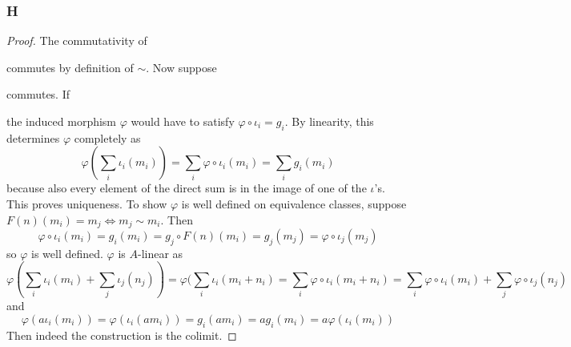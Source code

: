 \documentclass{article}
\newcommand{\fI}{\mathscr{I}}
\begin{document}
\subsubsection{H}\label{1.4.H}
\begin{proof}
    The commutativity of 
    \begin{center}
    \end{center}
    commutes by definition of $\sim$. Now suppose
    \begin{center}
    \end{center}
    commutes. If 
    \begin{center}
    \end{center}
    the induced morphism $\varphi$ would have to satisfy $\varphi\circ \iota_i=g_i$. By linearity, this determines $\varphi$ completely as
    \[
    \varphi(\sum_i \iota_i(m_i))=\sum_i \varphi\circ \iota_i(m_i)=\sum_i g_i(m_i)
    \]
    because also every element of the direct sum is in the image of one of the $\iota$'s.
    This proves uniqueness. To show $\varphi$ is well defined on equivalence classes, suppose $F(n)(m_i)=m_j\iff m_j\sim m_i$. Then
    \[
    \varphi\circ \iota_i(m_i)=g_i(m_i)=g_j\circ F(n)(m_i)=g_j(m_j)=\varphi\circ \iota_j(m_j)
    \]
    so $\varphi$ is well defined. $\varphi$ is $A$-linear as 
    \[
    \varphi(\sum_i\iota_i(m_i)+\sum_j\iota_j(n_j))=\varphi(\sum_i \iota_i(m_i+n_i)=\sum_i \varphi \circ \iota_i(m_i+n_i)=\sum_i\varphi\circ \iota_i(m_i)+\sum_j \varphi\circ \iota_j(n_j)
    \]
    and 
    \[
    \varphi(a\iota_i(m_i))=\varphi(\iota_i(am_i))=g_i(am_i)=ag_i(m_i)=a\varphi(\iota_i(m_i))
    \]
    Then indeed the construction is the colimit.
\end{proof}
\end{document}
